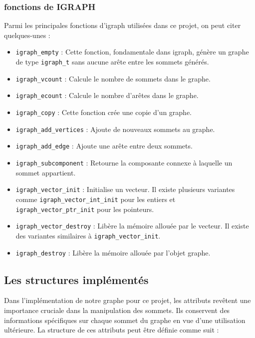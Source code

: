 \documentclass[10pt]{article}
\begin{document}
\subsubsection{fonctions de IGRAPH}

Parmi les principales fonctions d'igraph utilisées dans ce projet, on peut citer quelques-unes :

\begin{itemize}
    \item \texttt{igraph\_empty} : Cette fonction, fondamentale dans igraph, génère un graphe de type \texttt{igraph\_t} sans aucune arête entre les sommets générés.
    \item \texttt{igraph\_vcount} : Calcule le nombre de sommets dans le graphe.
    \item \texttt{igraph\_ecount} : Calcule le nombre d'arêtes dans le graphe.
    \item \texttt{igraph\_copy} : Cette fonction crée une copie d'un graphe.
    \item \texttt{igraph\_add\_vertices} : Ajoute de nouveaux sommets au graphe.
    \item \texttt{igraph\_add\_edge} : Ajoute une arête entre deux sommets.
    \item \texttt{igraph\_subcomponent} : Retourne la composante connexe à laquelle un sommet appartient.
    \item \texttt{igraph\_vector\_init} : Initialise un vecteur. Il existe plusieurs variantes comme \texttt{igraph\_vector\_int\_init} pour les entiers et \texttt{igraph\_vector\_ptr\_init} pour les pointeurs.
    \item \texttt{igraph\_vector\_destroy} : Libère la mémoire allouée par le vecteur. Il existe des variantes similaires à \texttt{igraph\_vector\_init}.
    \item \texttt{igraph\_destroy} : Libère la mémoire allouée par l'objet graphe.
\end{itemize}

\subsection{Les structures implémentés}
Dans l'implémentation de notre graphe pour ce projet, les attributs revêtent une importance cruciale dans la manipulation des sommets. Ils conservent des informations spécifiques sur chaque sommet du graphe en vue d'une utilisation ultérieure. La structure de ces attributs peut être définie comme suit :
\end{document}
